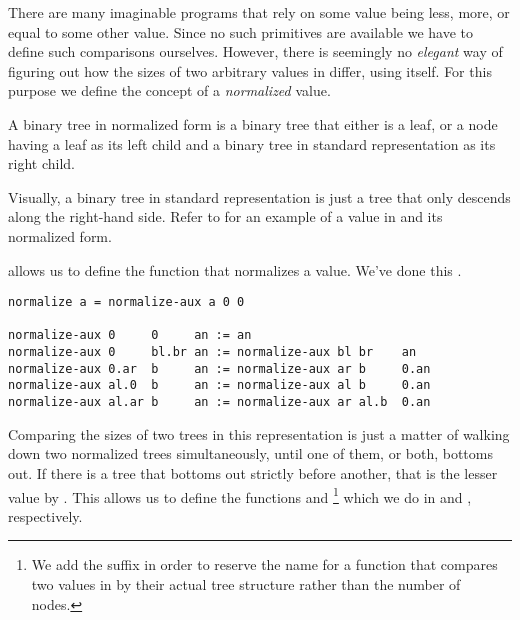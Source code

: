 There are many imaginable programs that rely on some value being less, more, or
equal to some other value. Since no such primitives are available we have to
define such comparisons ourselves. However, there is seemingly no
\emph{elegant} way of figuring out how the sizes of two arbitrary values in
\D{} differ, using \D{} itself. For this purpose we define the concept of a
\emph{normalized} value.

\begin{definition}\label{definition:normal-form} A binary tree in normalized
form is a binary tree that either is a leaf, or a node having a leaf as its
left child and a binary tree in standard representation as its right
child.\end{definition}

Visually, a binary tree in standard representation is just a tree that only
descends along the right-hand side. Refer to 
for an example of a value in \D{} and its normalized form.


 allows us to define the function
 that normalizes a value. We've done this
.

\begin{lstlisting}[label=listing:normalize,
  caption={The function \mono{normalize/1} turns any value $b\in\mathbb{B}$ into its normal form.}]
normalize a = normalize-aux a 0 0

normalize-aux 0     0     an := an
normalize-aux 0     bl.br an := normalize-aux bl br    an
normalize-aux 0.ar  b     an := normalize-aux ar b     0.an
normalize-aux al.0  b     an := normalize-aux al b     0.an
normalize-aux al.ar b     an := normalize-aux ar al.b  0.an
\end{lstlisting}

Comparing the sizes of two trees in this representation is just a matter of
walking down two normalized trees simultaneously, until one of them, or both,
bottoms out. If there is a tree that bottoms out strictly before another, that
is the lesser value by . This allows us to define the
functions  and \footnote{We add the
 suffix in order to reserve the name  for a function
that compares two values in \D{} by their actual tree structure rather than the
number of nodes.} which we do in  and
, respectively.

